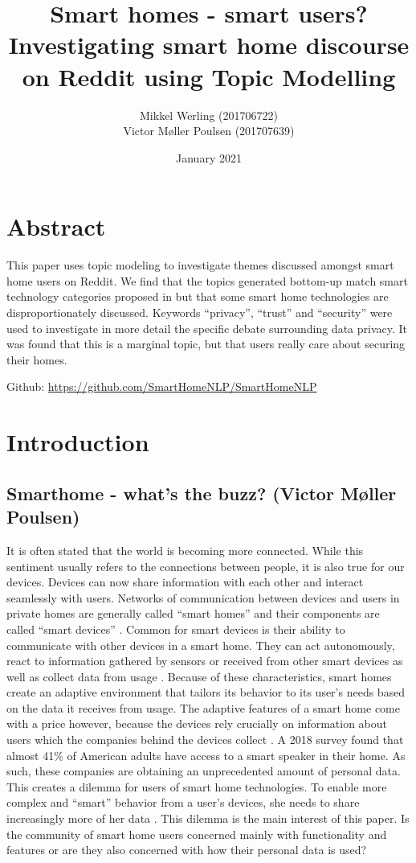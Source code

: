 \documentclass{article}
\title{Smart homes - smart users? \\
\large Investigating smart home discourse on Reddit using Topic Modelling
}
\author{Mikkel Werling (201706722) \\ Victor Møller Poulsen (201707639)}
\date{January 2021}
\begin{document}
    \maketitle
    \section{Abstract}
    This paper uses topic modeling to investigate themes discussed amongst smart home users on Reddit. We find that the topics generated bottom-up match smart technology categories proposed in  but that some smart home technologies are disproportionately discussed. Keywords “privacy”, “trust” and “security” were used to investigate in more detail the specific debate surrounding data privacy. It was found that this is a marginal topic, but that users really care about securing their homes.  
    \begin{center}
    Github: \url{https://github.com/SmartHomeNLP/SmartHomeNLP}
\end{center}

    \section{Introduction}
    \subsection{Smarthome - what's the buzz? (Victor Møller Poulsen)}
    It is often stated that the world is becoming more connected. While this sentiment usually refers to the connections between people, it is also true for our devices. Devices can now share information with each other and interact seamlessly with users. Networks of communication between devices and users in private homes are generally called “smart homes” and their components are called “smart devices” \cite{novak2019relationship}. Common for 
smart devices is their ability to communicate with other devices in a smart home. They can act autonomously, react to information gathered by sensors or received from other smart devices as well as collect data from usage \cite{hubert2020take}. Because of these characteristics, smart homes create an adaptive environment that tailors its behavior to its user’s needs based on the data it receives from usage. The adaptive features of a smart home come with a price however, because the devices rely crucially on information about users which the companies behind the devices collect \cite{novak2019relationship}. A 2018 survey \cite{perez_smart_2018} found that almost 41\% of American adults have access to a smart speaker in their home. As such, these companies are obtaining an unprecedented amount of personal data. This creates a dilemma for users of smart home technologies. To enable more complex and “smart” behavior from a user’s devices, she needs to share increasingly more of her data \cite{hubert2020take}. This dilemma is the main interest of this paper. Is the community of smart home users concerned mainly with functionality and features or are they also concerned with how their personal data is used?
\end{document}
